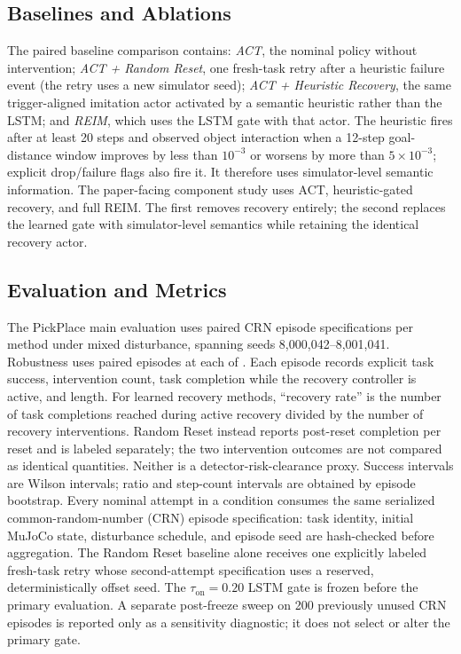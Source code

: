 \documentclass[conference]{IEEEtran}
\begin{document}
\subsection{Baselines and Ablations}

The paired baseline comparison contains:
\emph{ACT}, the nominal policy without intervention;
\emph{ACT + Random Reset}, one fresh-task retry after a heuristic failure event
(the retry uses a new simulator seed);
\emph{ACT + Heuristic Recovery}, the same trigger-aligned imitation actor
activated by a semantic heuristic rather than the LSTM; and \emph{REIM}, which
uses the LSTM gate with that actor. The heuristic fires after
at least 20 steps and observed object interaction when a 12-step goal-distance
window improves by less than $10^{-3}$ or worsens by more than
$5\times10^{-3}$; explicit drop/failure flags also fire it. It therefore uses
simulator-level semantic information. The paper-facing component study uses
ACT, heuristic-gated recovery, and full REIM. The first removes recovery
entirely; the second replaces the learned
gate with simulator-level semantics while retaining the identical recovery
actor.

\subsection{Evaluation and Metrics}

The PickPlace main evaluation uses \PlannedMainEpisodes{} paired CRN episode
specifications per method under \CurriculumNoiseLevel{} mixed disturbance,
spanning seeds 8{,}000{,}042--8{,}001{,}041. Robustness uses
\PlannedRobustnessEpisodes{} paired episodes at each of
\RobustnessLevels{}. Each episode records explicit task success, intervention
count, task completion while the recovery controller is active, and length.
For learned recovery methods, ``recovery rate'' is the number of task
completions reached
during active recovery divided by the number of recovery interventions.
Random Reset instead reports post-reset completion per reset and is labeled
separately; the two intervention outcomes are not compared as identical
quantities. Neither is a detector-risk-clearance proxy. Success intervals are
Wilson intervals; ratio and step-count intervals are obtained by episode
bootstrap. Every nominal attempt in a condition consumes the same serialized
common-random-number (CRN) episode specification: task identity, initial
MuJoCo state, disturbance schedule, and episode seed are hash-checked before
aggregation. The Random Reset baseline alone receives one explicitly labeled
fresh-task retry whose second-attempt specification uses a reserved,
deterministically offset seed. The $\tau_{\mathrm{on}}=0.20$ LSTM gate is
frozen before the primary evaluation. A separate post-freeze sweep on 200
previously unused CRN episodes is reported only as a sensitivity diagnostic;
it does not select or alter the primary gate.
\end{document}
